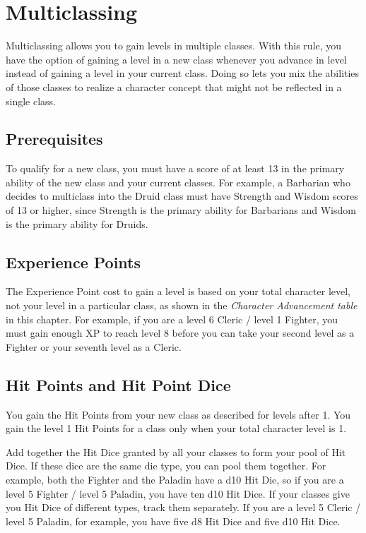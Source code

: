 \documentclass[10pt,a4paper,twoside,bg=print,twocolumn,openany,nodeprecatedcode]{dndbook}
\begin{document}
\section{Multiclassing}
Multiclassing allows you to gain levels in multiple classes. With this rule, you have the option of gaining a level in a new class whenever you advance in level instead of gaining a level in your current class. Doing so lets you mix the abilities of those classes to realize a character concept that might not be reflected in a single class.

\subsection{Prerequisites}
To qualify for a new class, you must have a score of at least 13 in the primary ability of the new class and your current classes. For example, a Barbarian who decides to multiclass into the Druid class must have Strength and Wisdom scores of 13 or higher, since Strength is the primary ability for Barbarians and Wisdom is the primary ability for Druids.

\subsection{Experience Points}
The Experience Point cost to gain a level is based on your total character level, not your level in a particular class, as shown in the \textit{Character Advancement table} in this chapter. For example, if you are a level 6 Cleric / level 1 Fighter, you must gain enough XP to reach level 8 before you can take your second level as a Fighter or your seventh level as a Cleric.

\subsection{Hit Points and Hit Point Dice}
You gain the Hit Points from your new class as described for levels after 1. You gain the level 1 Hit Points for a class only when your total character level is 1.

Add together the Hit Dice granted by all your classes to form your pool of Hit Dice. If these dice are the same die type, you can pool them together. For example, both the Fighter and the Paladin have a d10 Hit Die, so if you are a level 5 Fighter / level 5 Paladin, you have ten d10 Hit Dice. If your classes give you Hit Dice of different types, track them separately. If you are a level 5 Cleric / level 5 Paladin, for example, you have five d8 Hit Dice and five d10 Hit Dice.
\end{document}
